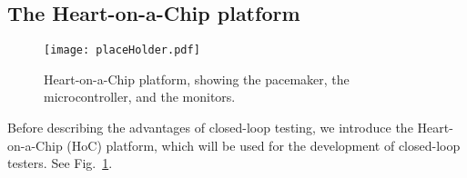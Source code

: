 \subsection{The Heart-on-a-Chip platform}
\label{HoC}

\begin{figure}[!t]
	\centering
	\texttt{[image: placeHolder.pdf]}		
	\caption{\small Heart-on-a-Chip platform, showing the pacemaker, the microcontroller, and the monitors.}
	\label{fig:hoc}
\end{figure} 

Before describing the advantages of closed-loop testing, we introduce the Heart-on-a-Chip (HoC) platform, which will be used for the development of closed-loop testers.
See Fig.~\ref{fig:hoc}.
